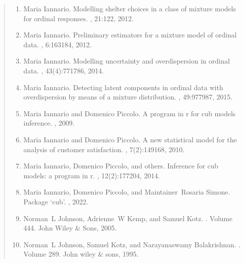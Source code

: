\documentclass[letterpaper,10pt,english]{sphinxmanual}
\begin{document}
\begin{quote}
\begin{enumerate}
\item {} 
\sphinxAtStartPar
Maria Iannario. Modelling shelter choices in a class of mixture models for ordinal responses. , 21:1\textendash{}22, 2012.

\item {} 
\sphinxAtStartPar
Maria Iannario. Preliminary estimators for a mixture model of ordinal data. , 6:163\textendash{}184, 2012.

\item {} 
\sphinxAtStartPar
Maria Iannario. Modelling uncertainty and overdispersion in ordinal data. , 43(4):771\textendash{}786, 2014.

\item {} 
\sphinxAtStartPar
Maria Iannario. Detecting latent components in ordinal data with overdispersion by means of a mixture distribution. , 49:977\textendash{}987, 2015.

\item {} 
\sphinxAtStartPar
Maria Iannario and Domenico Piccolo. A program in r for cub models inference. , 2009.

\item {} 
\sphinxAtStartPar
Maria Iannario and Domenico Piccolo. A new statistical model for the analysis of customer satisfaction. , 7(2):149\textendash{}168, 2010.

\item {} 
\sphinxAtStartPar
Maria Iannario, Domenico Piccolo, and others. Inference for cub models: a program in r. , 12(2):177\textendash{}204, 2014.

\item {} 
\sphinxAtStartPar
Maria Iannario, Domenico Piccolo, and Maintainer Rosaria Simone. Package ‘cub’. , 2022.

\item {} 
\sphinxAtStartPar
Norman L Johnson, Adrienne W Kemp, and Samuel Kotz. . Volume 444. John Wiley \& Sons, 2005.

\item {} 
\sphinxAtStartPar
Norman L Johnson, Samuel Kotz, and Narayanaswamy Balakrishnan. . Volume 289. John wiley \& sons, 1995.


\end{enumerate}
\end{quote}
\end{document}
